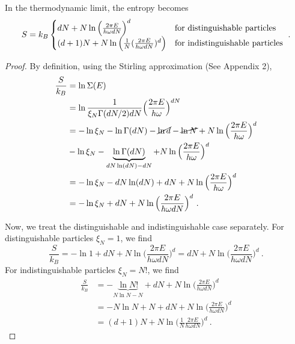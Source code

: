     In the thermodynamic limit, the entropy becomes
    \begin{equation*}
        S = k_B \begin{cases}
            d N + N \ln \Big (\frac{2 \pi E }{h \omega d N} \Big)^{d} & \textnormal{for distinguishable particles} \\
            (d+1) N + N \ln \Big ( \frac{1}{N} (\frac{2 \pi E }{h \omega d N} )^d \Big ) & \textnormal{for indistinguishable particles} \\
        \end{cases} ~.
    \end{equation*}
    \begin{proof}
        By definition, using the Stirling approximation (See Appendix 2),
        \begin{equation*}
        \begin{aligned}
            \frac{S}{k_B} & = \ln \Sigma (E) \\ & = \ln \frac{1}{\xi_N \Gamma(dN/2) d N} \Big ( \frac{2 \pi E}{h \omega} \Big)^{dN} \\ & = - \ln \xi_N - \ln \Gamma (dN) - \cancel{\ln d} - \cancel{\ln N} + N \ln \Big (\frac{2 \pi E }{h \omega} \Big )^{d} \\ & - \ln \xi_N - \underbrace{\ln \Gamma (dN)}_{dN \ln (dN) - dN} + N \ln \Big (\frac{2 \pi E }{h \omega} \Big )^{d} \\ & = - \ln \xi_N - dN \ln (dN) + d N + N \ln \Big (\frac{2 \pi E }{h \omega} \Big )^{d} \\ & = - \ln \xi_N + d N + N \ln \Big (\frac{2 \pi E }{h \omega d N} \Big )^{d} ~.
        \end{aligned}
        \end{equation*}

        Now, we treat the distinguishable and indistinguishable case separately. For distinguishable particles $\xi_N = 1$, we find
        \begin{equation*}
            \frac{S}{k_B} = - \ln 1 + d N + N \ln \Big (\frac{2 \pi E }{h \omega d N} \Big )^{d} = d N + N \ln \Big (\frac{2 \pi E }{h \omega d N} \Big )^{d} ~.
        \end{equation*}
        For indistinguishable particles $\xi_N = N!$, we find
        \begin{equation*}
        \begin{aligned}
            \frac{S}{k_B} & = - \underbrace{\ln N!}_{N \ln N - N} + d N + N \ln \Big (\frac{2 \pi E }{h \omega d N} \Big )^{d} \\ & =  - N \ln N + N + d N + N \ln \Big (\frac{2 \pi E }{h \omega d N} \Big )^{d} \\ & = (d+1) N + N \ln \Big ( \frac{1}{N} \frac{2 \pi E }{h \omega d N} \Big )^{d} ~.
        \end{aligned}
        \end{equation*}
    \end{proof}

